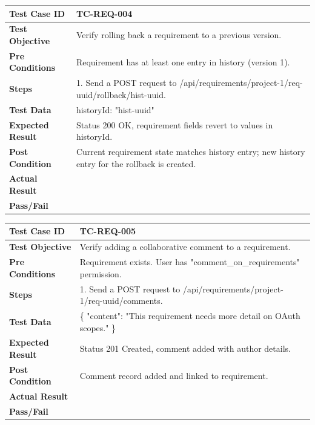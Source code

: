 \begin{longtable}{|p{}|p{}|}
\hline
\textbf{Test Case ID} & TC-REQ-004 \\ \hline
\textbf{Test Objective} & Verify rolling back a requirement to a previous version. \\ \hline
\textbf{Pre Conditions} & Requirement has at least one entry in history (version 1). \\ \hline
\textbf{Steps} & 
1. Send a POST request to /api/requirements/project-1/req-uuid/rollback/hist-uuid. \\ \hline
\textbf{Test Data} & historyId: "hist-uuid" \\ \hline
\textbf{Expected Result} & Status 200 OK, requirement fields revert to values in historyId. \\ \hline
\textbf{Post Condition} & Current requirement state matches history entry; new history entry for the rollback is created. \\ \hline
\textbf{Actual Result} &  \\ \hline
\textbf{Pass/Fail} &  \\ \hline
\end{longtable}

\begin{longtable}{|p{}|p{}|}
\hline
\textbf{Test Case ID} & TC-REQ-005 \\ \hline
\textbf{Test Objective} & Verify adding a collaborative comment to a requirement. \\ \hline
\textbf{Pre Conditions} & Requirement exists. User has "comment_on_requirements" permission. \\ \hline
\textbf{Steps} & 
1. Send a POST request to /api/requirements/project-1/req-uuid/comments. \\ \hline
\textbf{Test Data} & \{ "content": "This requirement needs more detail on OAuth scopes." \} \\ \hline
\textbf{Expected Result} & Status 201 Created, comment added with author details. \\ \hline
\textbf{Post Condition} & Comment record added and linked to requirement. \\ \hline
\textbf{Actual Result} &  \\ \hline
\textbf{Pass/Fail} &  \\ \hline
\end{longtable}

